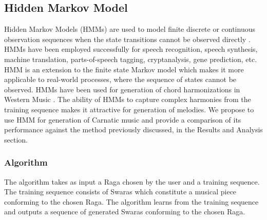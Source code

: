 \documentclass[journal]{IEEEtran}
\begin{document}
\subsection{Hidden Markov Model}
Hidden Markov Models (HMMs) are used to model finite discrete or continuous observation sequences when the state transitions cannot be observed directly \cite{stein}. HMMs have been employed successfully for speech recognition, speech synthesis, machine translation, parts-of-speech tagging, cryptanalysis, gene prediction, etc. HMM is an extension to the finite state Markov model which makes it more applicable to real-world processes, where the sequence of states cannot be observed. HMMs have been used for generation of chord harmonizations in Western Music \cite{hill}. The ability of HMMs to capture complex harmonies from the training sequence makes it attractive for generation of melodies. We propose to use HMM for generation of Carnatic music and provide a comparison of its performance against the method previously discussed, in the Results and Analysis section.

\subsubsection{Algorithm}
The algorithm takes as input a Raga chosen by the user and a training sequence. The training sequence consists of Swaras which constitute a musical piece conforming to the chosen Raga. The algorithm learns from the training sequence and outputs a sequence of generated Swaras conforming to the chosen Raga.\\
\end{document}
